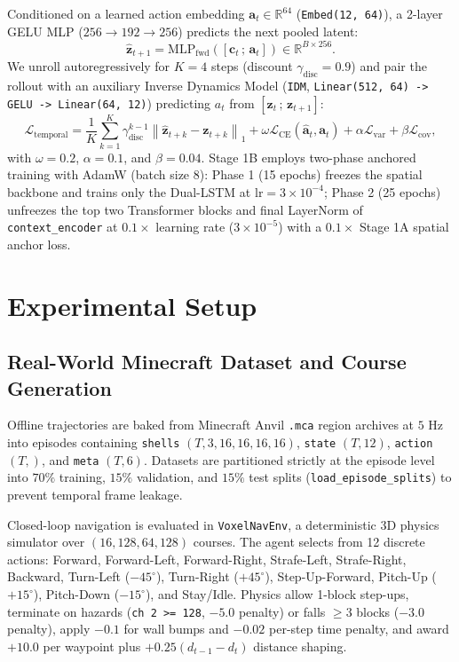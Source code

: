 \documentclass[runningheads]{llncs}
\begin{document}
Conditioned on a learned action embedding $\mathbf{a}_t \in \mathbb{R}^{64}$ (\texttt{Embed(12, 64)}), a 2-layer GELU MLP ($256 \to 192 \to 256$) predicts the next pooled latent:
\begin{equation}
\hat{\mathbf{z}}_{t+1} = \mathrm{MLP}_{\text{fwd}}\left(\left[\mathbf{c}_t\,;\,\mathbf{a}_t\right]\right) \in \mathbb{R}^{B \times 256}.
\end{equation}
We unroll autoregressively for $K = 4$ steps (discount $\gamma_{\text{disc}} = 0.9$) and pair the rollout with an auxiliary Inverse Dynamics Model (\texttt{IDM}, \texttt{Linear(512, 64) -> GELU -> Linear(64, 12)}) predicting $a_t$ from $[\mathbf{z}_t\,;\,\mathbf{z}_{t+1}]$:
\begin{equation}
\mathcal{L}_{\text{temporal}} = \frac{1}{K} \sum_{k=1}^{K} \gamma_{\text{disc}}^{k-1} \left\|\hat{\mathbf{z}}_{t+k} - \mathbf{z}_{t+k}\right\|_1 + \omega \mathcal{L}_{\text{CE}}\left(\hat{\mathbf{a}}_t, \mathbf{a}_t\right) + \alpha \mathcal{L}_{\text{var}} + \beta \mathcal{L}_{\text{cov}},
\end{equation}
with $\omega = 0.2$, $\alpha = 0.1$, and $\beta = 0.04$. Stage 1B employs two-phase anchored training with AdamW (batch size 8): Phase 1 (15 epochs) freezes the spatial backbone and trains only the Dual-LSTM at $\text{lr} = 3\times10^{-4}$; Phase 2 (25 epochs) unfreezes the top two Transformer blocks and final LayerNorm of \texttt{context\_encoder} at $0.1\times$ learning rate ($3\times10^{-5}$) with a $0.1\times$ Stage 1A spatial anchor loss.

\section{Experimental Setup}

\subsection{Real-World Minecraft Dataset and Course Generation}
Offline trajectories are baked from Minecraft Anvil \texttt{.mca} region archives at $5\text{ Hz}$ into episodes containing \texttt{shells} $(T, 3, 16, 16, 16, 16)$, \texttt{state} $(T, 12)$, \texttt{action} $(T,)$, and \texttt{meta} $(T, 6)$. Datasets are partitioned strictly at the episode level into $70\%$ training, $15\%$ validation, and $15\%$ test splits (\texttt{load\_episode\_splits}) to prevent temporal frame leakage.

Closed-loop navigation is evaluated in \texttt{VoxelNavEnv}, a deterministic 3D physics simulator over $(16, 128, 64, 128)$ courses. The agent selects from 12 discrete actions: Forward, Forward-Left, Forward-Right, Strafe-Left, Strafe-Right, Backward, Turn-Left ($-45^\circ$), Turn-Right ($+45^\circ$), Step-Up-Forward, Pitch-Up ($+15^\circ$), Pitch-Down ($-15^\circ$), and Stay/Idle. Physics allow 1-block step-ups, terminate on hazards (\texttt{ch 2 >= 128}, $-5.0$ penalty) or falls $\ge 3$ blocks ($-3.0$ penalty), apply $-0.1$ for wall bumps and $-0.02$ per-step time penalty, and award $+10.0$ per waypoint plus $+0.25(d_{t-1}-d_t)$ distance shaping.
\end{document}
